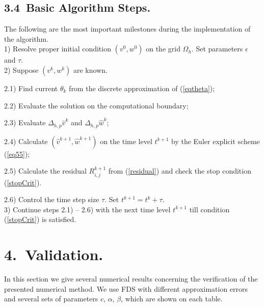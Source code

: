 \documentclass{article}
\newcommand{\rf}[1]{(\ref{#1})}
\begin{document}
\subsection{3.4~Basic Algorithm Steps.}
The following are the most important milestones during the implementation of the algorithm.
\\
1) Resolve proper initial condition $(v^0, w^0)$ on the grid $\Omega_h$.  Set parameters $\epsilon$ and $\tau$.
\\
2) Suppose $(v^k, w^k)$ are known. 
\par
2.1) Find current $\theta_k$ from the discrete approximation of \rf{eqtheta};
\par
2.2) Evaluate the solution on the computational boundary;
\par
2.3) Evaluate $\Delta_{h,p}  \widehat{v}^k$ and $\Delta_{h,p}  \widehat{w}^k$;
\par
2.4) Calculate $(\widehat{v}^{k+1}, \widehat{w}^{k+1})$  on the  time level $t^{k+1}$ by the Euler explicit scheme   \rf{eq55};
\par
2.5) Calculate the residual $R^{k+1}_{i,j}$ from \rf{residual} and check the stop condition \rf{stopCrit}.
\par
2.6) Control the time step size $\tau$. Set $t^{k+1}=t^{k}+\tau$.
\\
3) Continue steps 2.1) -- 2.6) with the next time level $t^{k+1}$ till condition (\ref{stopCrit}) is satisfied.

\section{4.~Validation.}\label{validation}

In this section we give several numerical results concerning the verification of  the presented numerical method. 
 We use FDS with different approximation errors and several sets  of  parameters $c$, $\alpha$, $\beta$,  which are shown on each table. 
\end{document}
